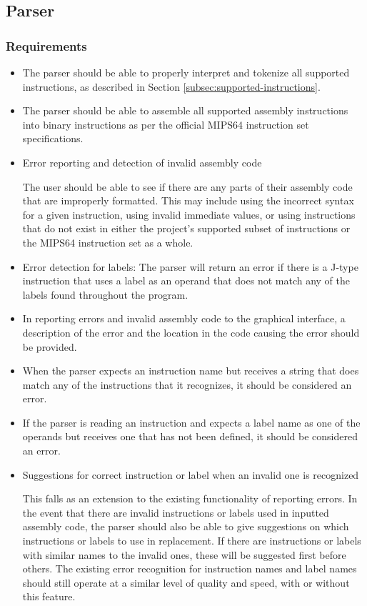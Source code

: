 \documentclass[
    paper=letter,
    parskip=half,
    fontsize=12pt,
    titlepage=firstiscover,
    toc=bibliography,
    numbers=endperiod
]{scrartcl}
\begin{document}
\subsection{Parser}
\subsubsection{Requirements}
\begin{itemize}
    \item The parser should be able to properly interpret and tokenize all
          supported instructions, as described in Section
          \ref{subsec:supported-instructions}.
    \item The parser should be able to assemble all supported assembly
          instructions into binary instructions as per the official MIPS64
          instruction set specifications.
    \item Error reporting and detection of invalid assembly code

          The user should be able to see if there are any parts of their assembly
          code that are improperly formatted. This may include using the incorrect
          syntax for a given instruction, using invalid immediate values, or using
          instructions that do not exist in either the project's supported subset
          of instructions or the MIPS64 instruction set as a whole.
    \item Error detection for labels: The parser will return an error if there is
          a J-type instruction that uses a label as an operand that does not match
          any of the labels found throughout the program.
    \item In reporting errors and invalid assembly code to the graphical
          interface, a description of the error and the location in the code
          causing the error should be provided.
    \item When the parser expects an instruction name but receives a string that
          does match any of the instructions that it recognizes, it should be
          considered an error.
    \item If the parser is reading an instruction and expects a label name as one
          of the operands but receives one that has not been defined, it should be
          considered an error.
    \item Suggestions for correct instruction or label when an invalid one is
          recognized

          This falls as an extension to the existing functionality of reporting
          errors. In the event that there are invalid instructions or labels used
          in inputted assembly code, the parser should also be able to give
          suggestions on which instructions or labels to use in replacement. If
          there are instructions or labels with similar names to the invalid ones,
          these will be suggested first before others. The existing error
          recognition for instruction names and label names should still operate
          at a similar level of quality and speed, with or without this feature.
\end{itemize}
\end{document}

